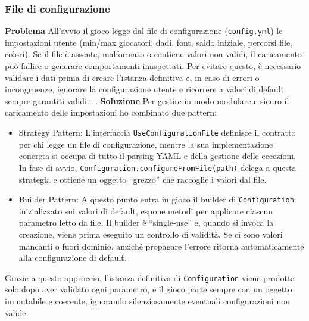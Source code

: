 \subsubsection{File di configurazione}
\textbf{Problema}\newline
All'avvio il gioco legge dal file di configurazione (\texttt{config.yml}) le impostazioni utente (min/max giocatori, dadi, font, saldo iniziale, percorsi file, colori).\newline
Se il file è assente, malformato o contiene valori non validi, il caricamento può fallire o generare comportamenti inaspettati.\newline
Per evitare questo, è necessario validare i dati prima di creare l'istanza definitiva e, in caso di errori o incongruenze, 
ignorare la configurazione utente e ricorrere a valori di default sempre garantiti validi.
\dots\newline
\textbf{Soluzione}\newline
Per gestire in modo modulare e sicuro il caricamento delle impostazioni ho combinato due pattern:\newline
\begin{itemize}
  \item Strategy Pattern: 
        L'interfaccia \texttt{UseConfigurationFile} definisce il contratto per chi legge un file di configurazione, mentre la sua implementazione concreta si occupa di tutto il parsing YAML e della gestione delle eccezioni. \newline
        In fase di avvio, \texttt{Configuration.configureFromFile(path)} delega a questa strategia e ottiene un oggetto “grezzo” che raccoglie i valori dal file.

  \item Builder Pattern:
        A questo punto entra in gioco il builder di \texttt{Configuration}: inizializzato sui valori di default, espone metodi per applicare ciascun parametro letto da file. \newline
        Il builder è “single-use” e, quando si invoca la creazione, viene prima eseguito un controllo di validità.
        Se ci sono valori mancanti o fuori dominio, anziché propagare l'errore ritorna automaticamente alla configurazione di default.

\end{itemize}
Grazie a questo approccio, l'istanza definitiva di \texttt{Configuration} viene prodotta solo dopo aver validato ogni parametro, 
e il gioco parte sempre con un oggetto immutabile e coerente, ignorando silenziosamente eventuali configurazioni non valide.
